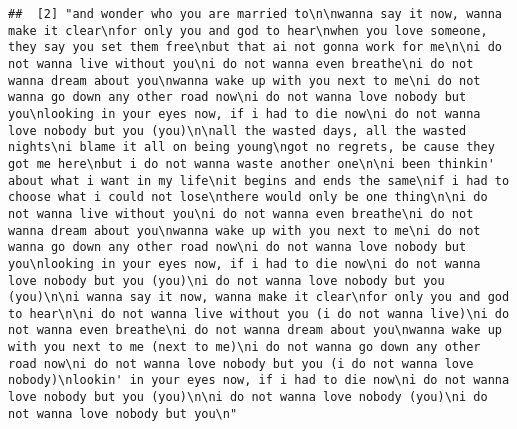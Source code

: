 \documentclass[]{article}
\begin{document}
\begin{verbatim}
##  [2] "and wonder who you are married to\n\nwanna say it now, wanna make it clear\nfor only you and god to hear\nwhen you love someone, they say you set them free\nbut that ai not gonna work for me\n\ni do not wanna live without you\ni do not wanna even breathe\ni do not wanna dream about you\nwanna wake up with you next to me\ni do not wanna go down any other road now\ni do not wanna love nobody but you\nlooking in your eyes now, if i had to die now\ni do not wanna love nobody but you (you)\n\nall the wasted days, all the wasted nights\ni blame it all on being young\ngot no regrets, be cause they got me here\nbut i do not wanna waste another one\n\ni been thinkin' about what i want in my life\nit begins and ends the same\nif i had to choose what i could not lose\nthere would only be one thing\n\ni do not wanna live without you\ni do not wanna even breathe\ni do not wanna dream about you\nwanna wake up with you next to me\ni do not wanna go down any other road now\ni do not wanna love nobody but you\nlooking in your eyes now, if i had to die now\ni do not wanna love nobody but you (you)\ni do not wanna love nobody but you (you)\n\ni wanna say it now, wanna make it clear\nfor only you and god to hear\n\ni do not wanna live without you (i do not wanna live)\ni do not wanna even breathe\ni do not wanna dream about you\nwanna wake up with you next to me (next to me)\ni do not wanna go down any other road now\ni do not wanna love nobody but you (i do not wanna love nobody)\nlookin' in your eyes now, if i had to die now\ni do not wanna love nobody but you (you)\n\ni do not wanna love nobody (you)\ni do not wanna love nobody but you\n"                                                                                                                                                                                                                                                                                                                                                                                                                                                                                                                                                                                                                                                                                                                                                                                                                                                                                                                                                                                                                                                                                                                                                                                                                                                                 

\end{verbatim}
\end{document}

